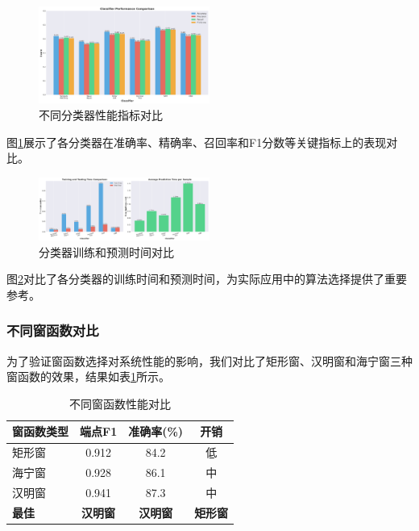 \documentclass[sigconf,nonacm]{acmart}
\begin{document}
\begin{figure}[htbp]
\centering
\includegraphics[width=0.5\textwidth]{comparison/metrics_comparison.png}
\caption{不同分类器性能指标对比}
\label{fig:metrics_comparison}
\end{figure}

图\ref{fig:metrics_comparison}展示了各分类器在准确率、精确率、召回率和F1分数等关键指标上的表现对比。

\begin{figure}[htbp]
\centering
\includegraphics[width=0.5\textwidth]{comparison/time_comparison.png}
\caption{分类器训练和预测时间对比}
\label{fig:time_comparison}
\end{figure}

图\ref{fig:time_comparison}对比了各分类器的训练时间和预测时间，为实际应用中的算法选择提供了重要参考。

\subsubsection{不同窗函数对比}

为了验证窗函数选择对系统性能的影响，我们对比了矩形窗、汉明窗和海宁窗三种窗函数的效果，结果如表\ref{tab:window_comparison}所示。

\begin{table}[htbp]
\caption{不同窗函数性能对比}
\label{tab:window_comparison}
\begin{center}
\begin{tabular}{lccc}
\toprule
\textbf{窗函数类型} & \textbf{端点F1} & \textbf{准确率(\%)} & \textbf{开销} \\
\midrule
矩形窗 & 0.912 & 84.2 & 低 \\
海宁窗 & 0.928 & 86.1 & 中 \\
汉明窗 & 0.941 & 87.3 & 中 \\
\midrule
\textbf{最佳} & \textbf{汉明窗} & \textbf{汉明窗} & \textbf{矩形窗} \\
\bottomrule
\end{tabular}
\end{center}
\end{table}
\end{document}
